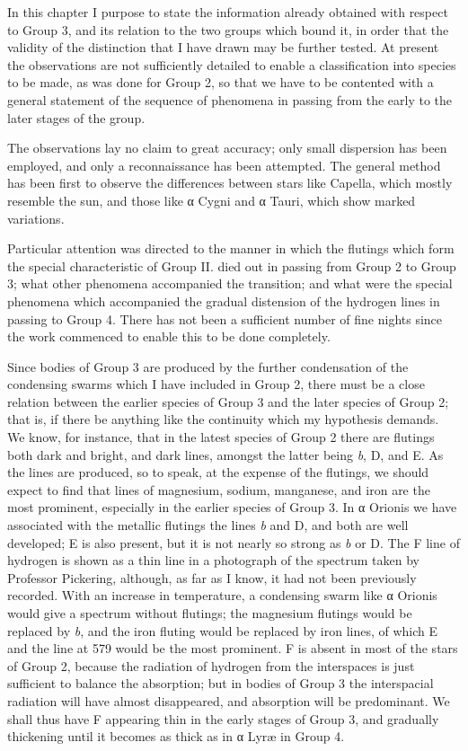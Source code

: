 \documentclass[a4paper, 12pt, oneside, polutonikogreek, english]{article}
\begin{document}
In this chapter I purpose to state the information already obtained with respect to Group 3, and its relation to the two groups which bound it, in order that the validity of the distinction that I have drawn may be further tested. At present the observations are not sufficiently detailed to enable a classification into species to be made, as was done for Group 2, so that we have to be contented with a general statement of the sequence of phenomena in passing from the early to the later stages of the group.

The observations lay no claim to great accuracy; only small dispersion has been employed, and only a reconnaissance has been attempted. The general method has been first to observe the differences between stars like Capella, which mostly resemble the sun, and those like α Cygni and α Tauri, which show marked variations.

Particular attention was directed to the manner in which the flutings which form the special characteristic of Group II. died out in passing from Group 2 to Group 3; what other phenomena accompanied the transition; and what were the special phenomena which accompanied the gradual distension of the hydrogen lines in passing to Group 4. There has not been a sufficient number of fine nights since the work commenced to enable this to be done completely.

Since bodies of Group 3 are produced by the further condensation of the condensing swarms which I have included in Group 2, there must be a close relation between the earlier species of Group 3 and the later species of Group 2; that is, if there be anything like the continuity which my hypothesis demands. We know, for instance, that in the latest species of Group 2 there are flutings both dark and bright, and dark lines, amongst the latter being \emph{b}, D, and E. As the lines are produced, so to speak, at the expense of the flutings, we should expect to find that lines of magnesium, sodium, manganese, and iron are the most prominent, especially in the earlier species of Group 3. In α Orionis we have associated with the metallic flutings the lines \emph{b} and D, and both are well developed; E is also present, but it is not nearly so strong as \emph{b} or D. The F line of hydrogen is shown as a thin line in a photograph of the spectrum taken by Professor Pickering, although, as far as I know, it had not been previously recorded. With an increase in temperature, a condensing swarm like α Orionis would give a spectrum without flutings; the magnesium flutings would be replaced by \emph{b}, and the iron fluting would be replaced by iron lines, of which E and the line at 579 would be the most prominent. F is absent in most of the stars of Group 2, because the radiation of hydrogen from the interspaces is just sufficient to balance the absorption; but in bodies of Group 3 the interspacial radiation will have almost disappeared, and absorption will be predominant. We shall thus have F appearing thin in the early stages of Group 3, and gradually thickening until it becomes as thick as in α Lyræ in Group 4.
\end{document}
